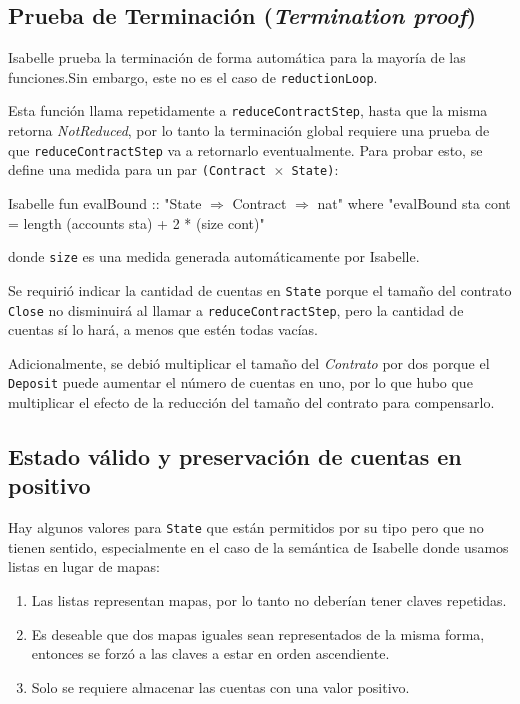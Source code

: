 \documentclass[12pt]{book}
\begin{document}
\subsection{Prueba de Terminación (\textit{Termination proof})}
Isabelle prueba la terminación de forma automática para la mayoría de las funciones.Sin embargo, este no es el caso de \texttt{reductionLoop}.

Esta función llama repetidamente a \texttt{reduceContractStep}, hasta que la misma retorna \textit{NotReduced}, por lo tanto la terminación global requiere una prueba de que \texttt{reduceContractStep} va a retornarlo eventualmente. Para probar esto, se define una medida para un par \texttt{(Contract $\times$ State)}:

\begin{code}[title=Función que será utilizada por \textit{measure} para probar la terminación de \textit{reductionLoop}, label=lst:evalBound]{Isabelle}
fun evalBound :: "State $\Rightarrow$ Contract $\Rightarrow$ nat" where
"evalBound sta cont = length (accounts sta) + 2 * (size cont)"
\end{code}
donde \texttt{size} es una medida generada automáticamente por Isabelle. 

Se requirió indicar la cantidad de cuentas en \texttt{State} porque el tamaño del contrato \texttt{Close} no disminuirá al llamar a \texttt{reduceContractStep}, pero la cantidad de cuentas sí lo hará, a menos que estén todas vacías.

Adicionalmente, se debió multiplicar el tamaño del \textit{Contrato} por dos porque el \texttt{Deposit} puede aumentar el número de cuentas en uno, por lo que hubo que multiplicar el efecto de la reducción del tamaño del contrato para compensarlo.


\subsection{Estado válido y preservación de cuentas en positivo}
Hay algunos valores para \texttt{State} que están permitidos por su tipo pero que no tienen sentido, especialmente en el caso de la semántica de Isabelle donde usamos listas en lugar de mapas:

\begin{enumerate}
    \item Las listas representan mapas, por lo tanto no deberían tener claves repetidas.
    \item Es deseable que dos mapas iguales sean representados de la misma forma, entonces se forzó a las claves a estar en orden ascendiente.
    \item Solo se requiere almacenar las cuentas con una valor positivo.
\end{enumerate}
\end{document}
